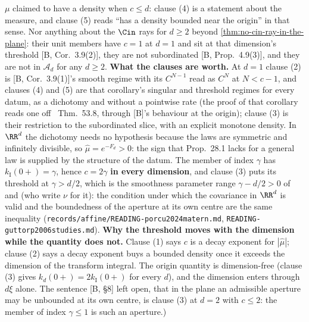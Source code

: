 \begin{theorem}
{$\mu$ claimed to have a density when $c \le d$: clause (4) is a statement about the measure, and
clause (5) reads ``has a density bounded near the origin'' in that sense. Nor anything about the
$\Cin$ rays for $d \ge 2$ beyond \ref{thm:no-cin-ray-in-the-plane}: their unit members have $c = 1$
at $d = 1$ and sit at that dimension's threshold [B, Cor.~3.9(2)], they are not subordinated
[B, Prop.~4.9(3)], and they are not in $\mathcal{A}_d$ for any $d \ge 2$.
\textbf{What the clauses are worth.} At $d = 1$ clause (2) is
[B, Cor.~3.9(1)]'s smooth regime with its $C^{N-1}$ read as $C^N$ at $N < c-1$, and clauses (4)
and (5) are that corollary's singular and threshold regimes for every datum, as a dichotomy and
without a pointwise rate (the proof of that corollary reads one off
~Thm.~53.8, through [B]'s behaviour at the origin); clause (3) is their
restriction to the subordinated slice, with an explicit monotone density. In $\RR^d$ the
dichotomy needs no hypothesis because the laws are symmetric and infinitely divisible, so
$\widehat\mu = e^{-F_d} > 0$: the sign that Prop.~28.1 lacks for a general law is supplied by the
structure of the datum.
The \Matern{} member of index $\gamma$ has $k_{\mathrm I}(0{+}) = \gamma$, hence $c = 2\gamma$
\textbf{in every dimension}, and clause (3) puts its threshold at $\gamma > d/2$, which is the
smoothness parameter range $\gamma - d/2 > 0$ of  and
 (who write $\nu$ for it): the condition under which the \Matern{}
covariance in $\RR^d$ is valid and the boundedness of the aperture at its own centre are the same
inequality (\texttt{records/affine/READING-porcu2024matern.md},
\texttt{READING-guttorp2006studies.md}). \textbf{Why the threshold moves with the dimension while
the quantity does not.} Clause (1) says $c$ is a decay exponent for $|\widehat\mu|$; clause (2)
says a decay exponent buys a bounded density once it exceeds the dimension of the transform
integral. The origin quantity is dimension-free (clause (3) gives $k_d(0{+}) = 2k_{\mathrm I}(0{+})$
for every $d$), and the dimension enters through $d\xi$ alone. The sentence [B, \S 8] left open,
that in the plane an admissible aperture may be unbounded at its own centre, is clause (3) at
$d = 2$ with $c \le 2$: the \Matern{} member of index $\gamma \le 1$ is such an aperture.)}
\end{theorem}

